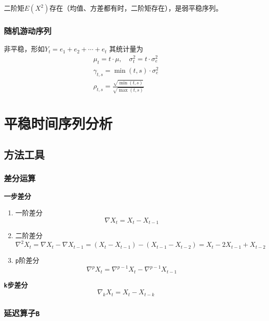 \documentclass{article} %
\begin{document}
二阶矩$E(X^2)$存在（均值、方差都有时，二阶矩存在），是弱平稳序列。

\subsubsection{随机游动序列}

非平稳，形如\(Y_t=e_1+e_2+\cdots+e_t\)
其统计量为
\[\begin{gathered}
  \mu_t=t\cdot \mu,\quad \sigma_t^2=t\cdot \sigma_e^2\\
  \gamma_{t,s}=\min(t,s)\cdot \sigma_e^2\\
   \rho_{t,s}=\frac{\sqrt{\min(t,s)}}{\sqrt{\max(t,s)}}
\end{gathered}\]


\section{平稳时间序列分析}

\subsection{方法工具}

\subsubsection{差分运算}

\textbf{一步差分}
\begin{enumerate}
\item 一阶差分
  \[
  \nabla X_t=X_{t}-X_{t-1}
  \]
\item 二阶差分
  \[
  \nabla^{2}X_{t}=\nabla X_{t}-\nabla X_{t-1}=(X_{t}-X_{t-1})-(X_{t-1}-X_{t-2})=X_{t}-2X_{t-1}+X_{t-2}
  \]
\item \texttt{p}阶差分
  \[
  \nabla^pX_t=\nabla^{p-1}X_t-\nabla^{p-1}X_{t-1}
  \]
\end{enumerate}

\textbf{\texttt{k}步差分}
\[
\nabla_kX_t=X_t-X_{t-k}
\]

\subsubsection{延迟算子\texttt{B}}
\end{document}
